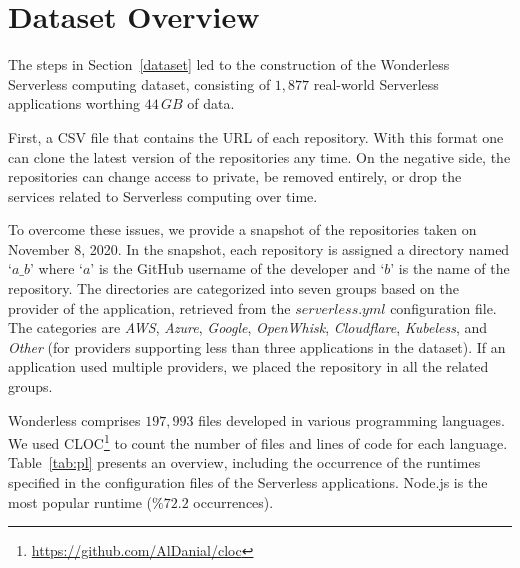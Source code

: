 
\section{Dataset Overview}
\label{schema}

The steps in Section~\ref{dataset} led to the construction of the 
Wonderless Serverless computing dataset, consisting of $1,877$
real-world Serverless applications worthing $44 \, GB$ of data. 

First, a CSV file that contains the URL of each repository. 
With this format one can clone the latest version of the repositories any time. 
On the negative side, the repositories can change access to private, 
be removed entirely, or drop the services related to Serverless computing 
over time. 

To overcome these issues, we provide a snapshot of the 
repositories taken on November 8, 2020. 
In the snapshot, each repository is assigned a directory named `$a\_b$' 
where `$a$' is the GitHub username of the developer and `$b$' is the name of the repository. 
The directories are categorized into seven groups based on the provider of the application, 
retrieved from the $serverless.yml$ configuration file. 
The categories are \emph{AWS}, \emph{Azure}, \emph{Google}, \emph{OpenWhisk}, 
\emph{Cloudflare}, \emph{Kubeless}, 
and \emph{Other} (for providers supporting less than three applications in the dataset).
If an application used multiple providers, we placed the repository in 
all the related groups. 

Wonderless comprises $197,993$ files developed in various programming languages. 
We used CLOC\footnote{\url{https://github.com/AlDanial/cloc}} to count the number of files and 
lines of code for each language. Table~\ref{tab:pl} presents an overview, 
including the occurrence of the runtimes specified in the configuration files of the Serverless applications. 
Node.js is the most popular runtime 
($\%72.2$ occurrences).

